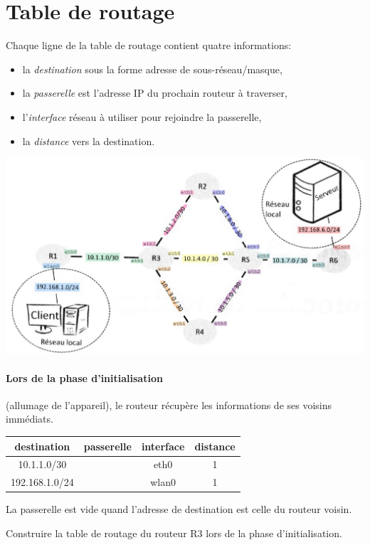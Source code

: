 \documentclass[a4paper,11pt]{article}
\begin{document}
\section{Table de routage}
Chaque ligne de la table de routage contient quatre informations:
\begin{itemize}
    \item la \emph{destination} sous la forme adresse de sous-réseau/masque,
    \item la \emph{passerelle} est l'adresse IP du prochain routeur à traverser,
    \item l'\emph{interface} réseau à utiliser pour rejoindre la passerelle,
    \item la \emph{distance} vers la destination.
\end{itemize}
\begin{center}
    \centering
    \includegraphics[width=16cm]{ressources/reseau.png}
    \label{reseau}
\end{center}
\paragraph{Lors de la phase d'initialisation} (allumage de l'appareil), le routeur récupère les informations de ses voisins immédiats.
\begin{center}
    \begin{tabular}{|*{4}{c|}}
        \hline
        destination & passerelle & interface & distance \\
        \hline
        10.1.1.0/30 & & eth0 & 1\\
        \hline
        192.168.1.0/24 & & wlan0 & 1\\
        \hline
    \end{tabular}
\end{center}
\begin{aretenir}[Remarque]
La passerelle est vide quand l'adresse de destination est celle du routeur voisin.
\end{aretenir}
\begin{activite}
Construire la table de routage du routeur R3 lors de la phase d'initialisation.
\end{activite}
\end{document}
